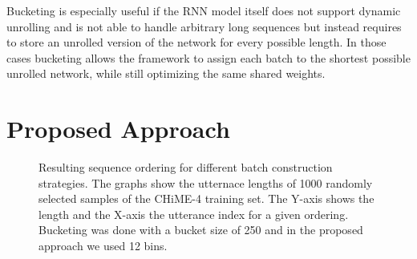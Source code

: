 \documentclass{article}
\begin{document}
  Bucketing is especially useful if the RNN model itself does not support dynamic unrolling and 
  is not able to handle arbitrary 
  long sequences but instead requires to store an unrolled version of the network for every possible 
  length. In those cases bucketing allows the framework to assign each batch to the shortest possible 
  unrolled network, while still optimizing the same shared weights.

  \section{Proposed Approach} \label{sec:approach}
  
  \begin{figure}
   	\caption{Resulting sequence ordering for different batch construction strategies. The graphs 
   	show the utternace lengths of 1000 randomly selected samples of the CHiME-4 training set. The 
   	Y-axis shows the length and the X-axis the utterance index for a given ordering. Bucketing was done with a bucket size of 250 and in the proposed approach we used 12 bins.}
   	  \label{fig:plot}
   	  \vspace{-5mm}
   \end{figure}
  
\end{document}
